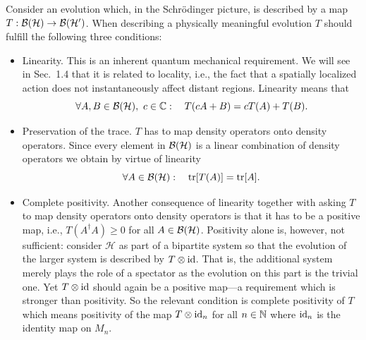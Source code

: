\documentclass[11pt,a4paper]{article}
\theoremstyle{plain}
\theoremstyle{definition}
\theoremstyle{remark}
\numberwithin{equation}{section}
\begin{document}
Consider an evolution which, in the Schr\"odinger picture, is described by a map $T:\mathcal{B}(\mathcal{H})\to \mathcal{B}(\mathcal{H}')$. When describing a physically meaningful evolution $T$ should fulfill the following three conditions:
\begin{itemize}
    \item Linearity. This is an inherent quantum mechanical requirement. We will see in Sec.~1.4 that it is related to locality, i.e., the fact that a spatially localized action does not instantaneously affect distant regions. Linearity means that
          \begin{equation}
              \forall A,B\in \mathcal{B}(\mathcal{H}),\ c\in \mathbb{C}:\quad T(cA+B)=cT(A)+T(B).
          \end{equation}
    \item Preservation of the trace. $T$ has to map density operators onto density operators. Since every element in $\mathcal{B}(\mathcal{H})$ is a linear combination of density operators we obtain by virtue of linearity
          \begin{equation}
              \forall A\in \mathcal{B}(\mathcal{H}):\quad \operatorname{tr}[T(A)]=\operatorname{tr}[A].
          \end{equation}
    \item Complete positivity. Another consequence of linearity together with asking $T$ to map density operators onto density operators is that it has to be a positive map, i.e., $T(A^\dagger A)\ge 0$ for all $A\in \mathcal{B}(\mathcal{H})$. Positivity alone is, however, not sufficient: consider $\mathcal{H}$ as part of a bipartite system so that the evolution of the larger system is described by $T\otimes \mathrm{id}$. That is, the additional system merely plays the role of a spectator as the evolution on this part is the trivial one. Yet $T\otimes \mathrm{id}$ should again be a positive map---a requirement which is stronger than positivity. So the relevant condition is complete positivity of $T$ which means positivity of the map $T\otimes \mathrm{id}_n$ for all $n\in \mathbb{N}$ where $\mathrm{id}_n$ is the identity map on $M_n$.
\end{itemize}
\end{document}
